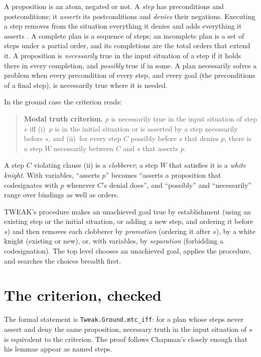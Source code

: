 \documentclass[11pt]{article}
\newcommand{\lean}[1]{\texttt{#1}}
\begin{document}
A proposition is an atom, negated or not. A \emph{step} has preconditions
and postconditions; it \emph{asserts} its postconditions and \emph{denies}
their negations. Executing a step removes from the situation everything it
denies and adds everything it asserts \citep[p.~6]{chapman1985}. A
complete plan is a sequence of steps; an incomplete plan is a set of steps
under a partial order, and its completions are the total orders that
extend it. A proposition is \emph{necessarily} true in the input situation
of a step if it holds there in every completion, and \emph{possibly} true
if in some. A plan necessarily solves a problem when every precondition of
every step, and every goal (the preconditions of a final step), is
necessarily true where it is needed.

In the ground case the criterion reads:

\begin{quote}
\textbf{Modal truth criterion.} $p$ is necessarily true in the input
situation of step $s$ iff (i)~$p$ is in the initial situation or is
asserted by a step necessarily before $s$, and (ii)~for every step $C$
possibly before $s$ that denies $p$, there is a step $W$ necessarily
between $C$ and $s$ that asserts $p$.
\end{quote}

A step $C$ violating clause (ii) is a \emph{clobberer}; a step $W$ that
satisfies it is a \emph{white knight}. With variables, ``asserts $p$''
becomes ``asserts a proposition that codesignates with $p$ whenever $C$'s
denial does'', and ``possibly'' and ``necessarily'' range over bindings as
well as orders.

TWEAK's procedure makes an unachieved goal true by establishment (using an
existing step or the initial situation, or adding a new step, and ordering
it before $s$) and then removes each clobberer by \emph{promotion}
(ordering it after $s$), by a white knight (existing or new), or, with
variables, by \emph{separation} (forbidding a codesignation). The top
level chooses an unachieved goal, applies the procedure, and searches the
choices breadth first.

\section{The criterion, checked}
\label{sec:mtc}

The formal statement is \lean{Tweak.Ground.mtc\_iff}: for a plan whose
steps never assert and deny the same proposition, necessary truth in the
input situation of $s$ is equivalent to the criterion. The proof follows
Chapman's \citep[pp.~38--43]{chapman1985} closely enough that his lemmas
appear as named steps.
\end{document}
